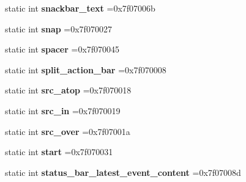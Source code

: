 \begin{DoxyCompactItemize}
\item 
\mbox{\label{classandroid_1_1support_1_1design_1_1R_1_1id_ac951a8240409499bc1ac4d276108e10c}} 
static int {\bfseries snackbar\+\_\+text} =0x7f07006b
\item 
\mbox{\label{classandroid_1_1support_1_1design_1_1R_1_1id_ad7af1d2186eda7858f9caf5e1dfa14dd}} 
static int {\bfseries snap} =0x7f070027
\item 
\mbox{\label{classandroid_1_1support_1_1design_1_1R_1_1id_ae2f6b245074b53afb41e7088d52de7de}} 
static int {\bfseries spacer} =0x7f070045
\item 
\mbox{\label{classandroid_1_1support_1_1design_1_1R_1_1id_a4cb3a05178774d57ff2f4c9dd7f40cca}} 
static int {\bfseries split\+\_\+action\+\_\+bar} =0x7f070008
\item 
\mbox{\label{classandroid_1_1support_1_1design_1_1R_1_1id_a0ed444c71df856c033a06a6d04414817}} 
static int {\bfseries src\+\_\+atop} =0x7f070018
\item 
\mbox{\label{classandroid_1_1support_1_1design_1_1R_1_1id_ad36813ab9d22383372877a7715a56677}} 
static int {\bfseries src\+\_\+in} =0x7f070019
\item 
\mbox{\label{classandroid_1_1support_1_1design_1_1R_1_1id_a3a71e0bf9efc7947cd3a18fe2e03f89b}} 
static int {\bfseries src\+\_\+over} =0x7f07001a
\item 
\mbox{\label{classandroid_1_1support_1_1design_1_1R_1_1id_a95c8811ef289f430c1ec59c33d77984d}} 
static int {\bfseries start} =0x7f070031
\item 
\mbox{\label{classandroid_1_1support_1_1design_1_1R_1_1id_a84f533dcd83803551876095c47b04cc6}} 
static int {\bfseries status\+\_\+bar\+\_\+latest\+\_\+event\+\_\+content} =0x7f07008d
\item 

\end{DoxyCompactItemize}
